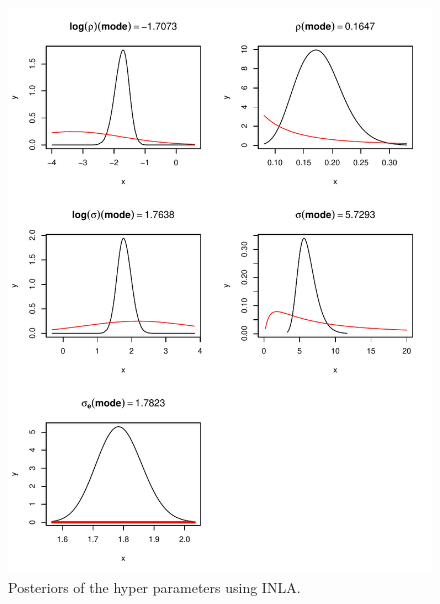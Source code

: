 \documentclass[a4paper,12pt]{article}
\begin{document}
\begin{figure}[htbp]
 \begin{center}
 \includegraphics[scale=0.8]{fig/1bsMesh_hyperpar.pdf}
 \end{center}
 \caption[Posterior hyper parameters]{Posteriors of the hyper parameters using INLA.}
 \label{fig:5}
 \end{figure}
\end{document}
